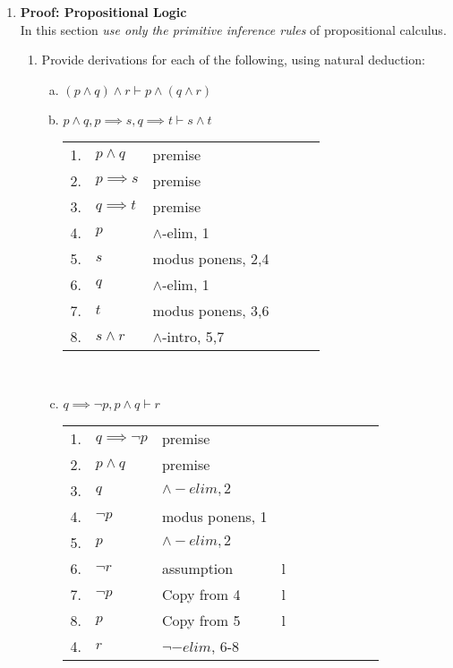 \documentclass{article}
\begin{document}
\begin{enumerate}[\bf I.]
\item \textbf{Proof: Propositional Logic} \\[6pt]
In this section {\em use only the primitive inference rules} of
propositional calculus.
\begin{enumerate}[1.] \setcounter{enumii}{0}
\item Provide derivations for each of the following, using natural
deduction:
\begin{enumerate}[a.]
 \item $(p \land q)\land r\vdash p \land (q \land r)$ \\
 \item $p \land q,p\implies s,q\implies t\vdash s\land t$ \\
   \begin{tabular}{l ll lll}
     1. & $p \land q$ & premise \\
     2. & $p \implies s$ & premise \\
     3. & $q \implies t$ & premise \\
     4. & $p$            & $\land$-elim, 1 \\
     5. & $s$            & modus ponens, 2,4 \\
     6. & $q$            & $\land$-elim, 1 \\
     7. & $t$            & modus ponens, 3,6 \\
     8. & $s\land r$     & $\land$-intro, 5,7 \\
   \end{tabular} \\
 \item $q \implies \neg p,p\land q\vdash r$ \\
   \begin{tabular}{l ll lll llll}
     1. & $q \implies \neg p$ & premise \\
     2. & $p \land q$         & premise \\
     3. & $q$                 & $\land -elim, 2$ \\
     4. & $\neg p$            & modus ponens, 1 \\  
     5. & $p$                 & $\land -elim, 2$ \\
     6.	& $\neg r$            & assumption  & l\\ 
     7. & $\neg p$            & Copy from 4 & l\\
     8. & $p$                 & Copy from 5 & l\\
     4. & $r$                 & $\neg -elim$, 6-8 \\

\end{tabular}
\end{enumerate}
\end{enumerate}
\end{enumerate}
\end{document}
